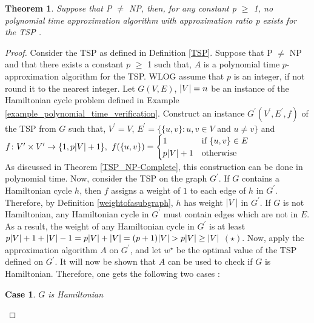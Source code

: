 \documentclass[12pt]{article}
\newtheorem{theorem}[definition]{Theorem}
\newtheorem{case}{Case}
\numberwithin{equation}{subsection}
\numberwithin{table}{subsection}
\numberwithin{algorithm}{subsection}
\begin{document}
\begin{theorem}
Suppose that P $\neq$ NP, then, for any constant p $\geq$ 1, no polynomial time approximation algorithm with approximation ratio p exists for the TSP {}.
\label{no_approx_tsp}
\end{theorem}
\begin{proof}
Consider the TSP as defined in Definition \ref{TSP}. Suppose that P $\neq$ NP and that there exists a constant $p$ $\geq$ 1 such that, $A$ is a polynomial time $p$-approximation algorithm for the TSP. WLOG assume that $p$ is an integer, if not round it to the nearest integer. Let $G(V,E)$, $\abs{V} = n$ be an instance of the Hamiltonian cycle problem defined in Example \ref{example_polynomial_time_verification}. Construct an instance $G^\prime(V^\prime,E^\prime,f)$ of the TSP from $G$ such that, $V^\prime = V$, $E^\prime = \{ \{u, v\} : u, v \in V$ and $u \neq v\}$ and \\ 
$f\colon V^\prime \times V^\prime \to \{1, p\abs{V} + 1\},$ $f(\{u, v\}) = \begin{cases} 1& \text{if } \{u, v\} \in E\\ p\abs{V} + 1              & \text{otherwise} \end{cases}$\\
As discussed in Theorem \ref{TSP_NP-Complete}, this construction can be done in polynomial time. Now, consider the TSP on the graph $G^\prime$. If $G$ contains a Hamiltonian cycle $h$, then $f$ assigns a weight of $1$ to each edge of $h$ in $G^\prime$. Therefore, by Definition \ref{weightofasubgraph}, $h$ has weight $\abs{V}$ in $G^\prime$. If $G$ is not Hamiltonian, any Hamiltonian cycle in $G^\prime$ must contain edges which are not in $E$. As a result, the weight of any Hamiltonian cycle in $G^\prime$ is at least $p\abs{V} + 1 + \abs{V} - 1 = p\abs{V} + \abs{V} = (p+1)\abs{V} > p\abs{V} \geq \abs{V}$ $(\star)$.  Now, apply the approximation algorithm $A$ on $G^\prime$, and let $w^\star$ be the optimal value of the TSP defined on $G^\prime$. It will now be shown that $A$ can be used to check if $G$ is Hamiltonian. Therefore, one gets the following two cases : 
\begin{case}
\label{case1}
$G$ is Hamiltonian 
\end{case}

\end{proof}
\end{document}
